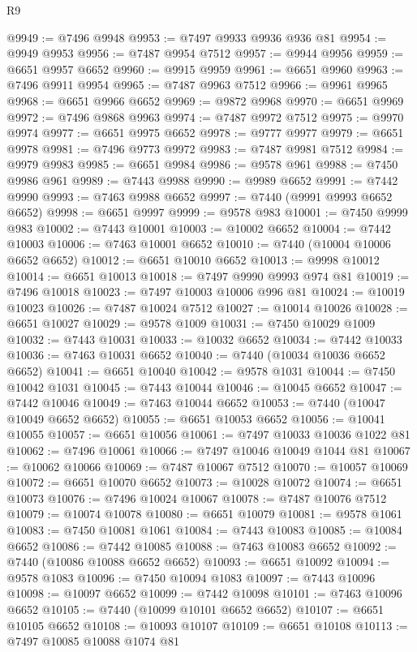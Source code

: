 \begin{lexlean}{R9}
\begin{coremodule}
{{{{{{{{{{{{{{{{{{{{{{{{{{{{{{{{{{{{{{{{{{{{{{{{{{{{{{{{{{{{{{{{{{{{{{{{{{{{{{{{{{{{@9949 := @7496 @9948
@9953 := @7497 @9933 @9936 @936 @81
@9954 := @9949 @9953
@9956 := @7487 @9954 @7512
@9957 := @9944 @9956
@9959 := @6651 @9957 @6652
@9960 := @9915 @9959
@9961 := @6651 @9960
@9963 := @7496 @9911 @9954
@9965 := @7487 @9963 @7512
@9966 := @9961 @9965
@9968 := @6651 @9966 @6652
@9969 := @9872 @9968
@9970 := @6651 @9969
@9972 := @7496 @9868 @9963
@9974 := @7487 @9972 @7512
@9975 := @9970 @9974
@9977 := @6651 @9975 @6652
@9978 := @9777 @9977
@9979 := @6651 @9978
@9981 := @7496 @9773 @9972
@9983 := @7487 @9981 @7512
@9984 := @9979 @9983
@9985 := @6651 @9984
@9986 := @9578 @961
@9988 := @7450 @9986 @961
@9989 := @7443 @9988
@9990 := @9989 @6652
@9991 := @7442 @9990
@9993 := @7463 @9988 @6652
@9997 := @7440 (@9991 @9993 @6652 @6652)
@9998 := @6651 @9997
@9999 := @9578 @983
@10001 := @7450 @9999 @983
@10002 := @7443 @10001
@10003 := @10002 @6652
@10004 := @7442 @10003
@10006 := @7463 @10001 @6652
@10010 := @7440 (@10004 @10006 @6652 @6652)
@10012 := @6651 @10010 @6652
@10013 := @9998 @10012
@10014 := @6651 @10013
@10018 := @7497 @9990 @9993 @974 @81
@10019 := @7496 @10018
@10023 := @7497 @10003 @10006 @996 @81
@10024 := @10019 @10023
@10026 := @7487 @10024 @7512
@10027 := @10014 @10026
@10028 := @6651 @10027
@10029 := @9578 @1009
@10031 := @7450 @10029 @1009
@10032 := @7443 @10031
@10033 := @10032 @6652
@10034 := @7442 @10033
@10036 := @7463 @10031 @6652
@10040 := @7440 (@10034 @10036 @6652 @6652)
@10041 := @6651 @10040
@10042 := @9578 @1031
@10044 := @7450 @10042 @1031
@10045 := @7443 @10044
@10046 := @10045 @6652
@10047 := @7442 @10046
@10049 := @7463 @10044 @6652
@10053 := @7440 (@10047 @10049 @6652 @6652)
@10055 := @6651 @10053 @6652
@10056 := @10041 @10055
@10057 := @6651 @10056
@10061 := @7497 @10033 @10036 @1022 @81
@10062 := @7496 @10061
@10066 := @7497 @10046 @10049 @1044 @81
@10067 := @10062 @10066
@10069 := @7487 @10067 @7512
@10070 := @10057 @10069
@10072 := @6651 @10070 @6652
@10073 := @10028 @10072
@10074 := @6651 @10073
@10076 := @7496 @10024 @10067
@10078 := @7487 @10076 @7512
@10079 := @10074 @10078
@10080 := @6651 @10079
@10081 := @9578 @1061
@10083 := @7450 @10081 @1061
@10084 := @7443 @10083
@10085 := @10084 @6652
@10086 := @7442 @10085
@10088 := @7463 @10083 @6652
@10092 := @7440 (@10086 @10088 @6652 @6652)
@10093 := @6651 @10092
@10094 := @9578 @1083
@10096 := @7450 @10094 @1083
@10097 := @7443 @10096
@10098 := @10097 @6652
@10099 := @7442 @10098
@10101 := @7463 @10096 @6652
@10105 := @7440 (@10099 @10101 @6652 @6652)
@10107 := @6651 @10105 @6652
@10108 := @10093 @10107
@10109 := @6651 @10108
@10113 := @7497 @10085 @10088 @1074 @81
}}}}}}}}}}}}}}}}}}}}}}}}}}}}}}}}}}}}}}}}}}}}}}}}}}}}}}}}}}}}}}}}}}}}}}}}}}}}}}}}}}}}
\end{coremodule}
\end{lexlean}
